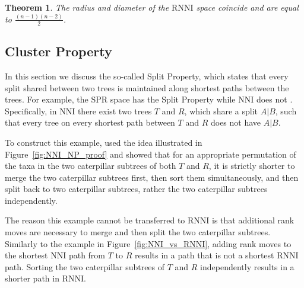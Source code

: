 \documentclass{amsart}
\newcommand{\nni}{\mathrm{NNI}}
\newcommand{\rnni}{\mathrm{RNNI}}
\newcommand{\spr}{\mathrm{SPR}}
\newtheorem{theorem}{Theorem}
\begin{document}
\begin{theorem}
The radius and diameter of the $\rnni$ space coincide and are equal to $\frac{(n-1)(n-2)}{2}$.
\label{thm:radius}
\end{theorem}


\subsection{Cluster Property}
\label{section:cluster_theorem}

In this section we discuss the so-called Split Property, which states that every split shared between two trees is maintained along shortest paths between the trees.
For example, the $\spr$ space has the Split Property while $\nni$ does not \autocite{Li1996-zw}.
Specifically, in $\nni$ there exist two trees $T$ and $R$, which share a split $A | B$, such that every tree on every shortest path between $T$ and $R$ does not have $A | B$.

To construct this example, \textcite{Li1996-zw} used the idea illustrated in Figure~\ref{fig:NNI_NP_proof} and showed that for an appropriate permutation of the taxa in the two caterpillar subtrees of both $T$ and $R$, it is strictly shorter to merge the two caterpillar subtrees first, then sort them simultaneously, and then split back to two caterpillar subtrees, rather the two caterpillar subtrees independently.

The reason this example cannot be transferred to $\rnni$ is that additional rank moves are necessary to merge and then split the two caterpillar subtrees.
Similarly to the example in Figure~\ref{fig:NNI_vs_RNNI}, adding rank moves to the shortest $\nni$ path from $T$ to $R$ results in a path that is not a shortest $\rnni$ path.
Sorting the two caterpillar subtrees of $T$ and $R$ independently results in a shorter path in $\rnni$.
\end{document}
